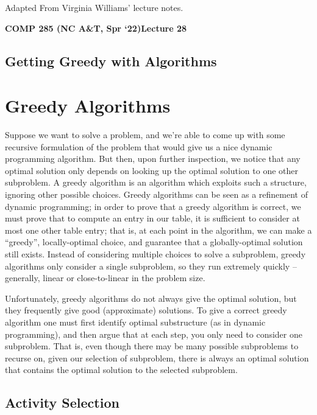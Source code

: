 \documentclass [12pt]{article}
\theoremstyle{definition}
\begin{document}
 

\vspace {1em} 
\begin {Instruction} 
Adapted From Virginia Williams' lecture notes.
\end {Instruction}  

{\LARGE \textbf {COMP 285 (NC A\&T, Spr `22)}\hfill \textbf {Lecture 28} } 

\begin{centering}
\section*{Getting Greedy with Algorithms}
\end{centering}

\section{Greedy Algorithms}

Suppose we want to solve a problem, and we're able to come up with some recursive formulation of the problem that would give us a nice dynamic programming algorithm. But then, upon further inspection, we notice that any optimal solution only depends on looking up the optimal solution to one other subproblem. A greedy algorithm is an algorithm which exploits such a structure, ignoring other possible choices. Greedy algorithms can be seen as a refinement of dynamic programming; in order to prove that a greedy algorithm is correct, we must prove that to compute an entry in our table, it is sufficient to consider at most one other table entry; that is, at each point in the algorithm, we can make a “greedy”, locally-optimal choice, and guarantee that a globally-optimal solution still exists. Instead of considering multiple choices to solve a subproblem, greedy algorithms only consider a single subproblem, so they run extremely quickly – generally, linear or close-to-linear in the problem size. 

Unfortunately, greedy algorithms do not always give the optimal solution, but they frequently give good (approximate) solutions. To give a correct greedy algorithm one must first identify optimal substructure (as in dynamic programming), and then argue that at each step, you only need to consider one subproblem. That is, even though there may be many possible subproblems to recurse on, given our selection of subproblem, there is always an optimal solution that contains the optimal solution to the selected subproblem.

\subsection{Activity Selection} 
\end{document}
